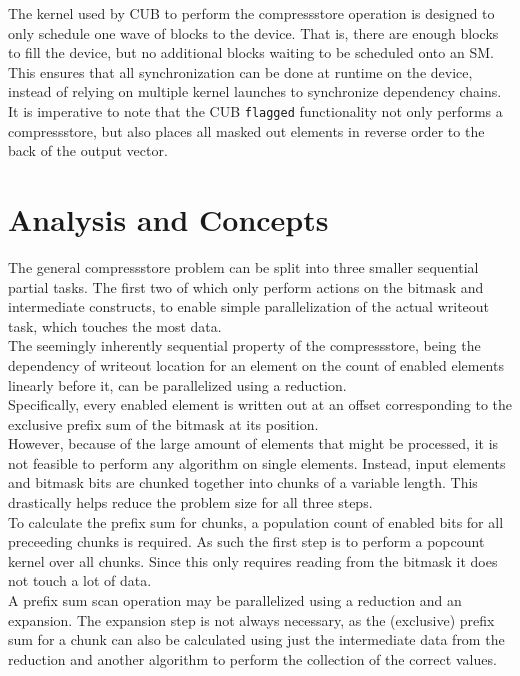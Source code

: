 \documentclass{tudscrreprt}
\begin{document}
			The kernel used by CUB to perform the compressstore operation is designed to only schedule one wave of blocks to the device. That is, there are enough blocks to fill the device, but no additional blocks waiting to be scheduled onto an SM. This ensures that all synchronization can be done at runtime on the device, instead of relying on multiple kernel launches to synchronize dependency chains. \\
			
			It is imperative to note that the CUB \texttt{flagged} functionality not only performs a compressstore, but also places all masked out elements in reverse order to the back of the output vector. \\
		
	\chapter{Analysis and Concepts}
		The general compressstore problem can be split into three smaller sequential partial tasks. The first two of which only perform actions on the bitmask and intermediate constructs, to enable simple parallelization of the actual writeout task, which touches the most data. \\
		
		The seemingly inherently sequential property of the compressstore, being the dependency of writeout location for an element on the count of enabled elements linearly before it, can be parallelized using a reduction. \\
		Specifically, every enabled element is written out at an offset corresponding to the exclusive prefix sum of the bitmask at its position. \\
		
		However, because of the large amount of elements that might be processed, it is not feasible to perform any algorithm on single elements. Instead, input elements and bitmask bits are chunked together into chunks of a variable length. This drastically helps reduce the problem size for all three steps. \\
		
		To calculate the prefix sum for chunks, a population count of enabled bits for all preceeding chunks is required. As such the first step is to perform a popcount kernel over all chunks. Since this only requires reading from the bitmask it does not touch a lot of data. \\
		
		A prefix sum scan operation may be parallelized using a reduction and an expansion. The expansion step is not always necessary, as the (exclusive) prefix sum for a chunk can also be calculated using just the intermediate data from the reduction and another algorithm to perform the collection of the correct values. \\
		
\end{document}

